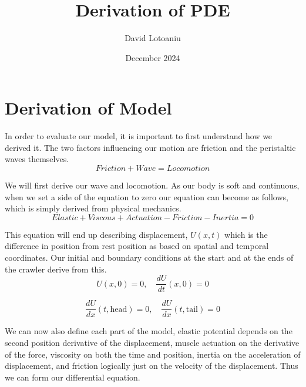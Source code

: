 \documentclass{article}
\title{Derivation of PDE}
\author{David Lotoaniu}
\date{December 2024}
\begin{document}
\maketitle

\section{Derivation of Model}
\par In order to evaluate our model, it is important to first understand how we derived it. The two factors influencing our motion are friction and the peristaltic waves themselves. 
\begin{equation}
    Friction + Wave = Locomotion
    \label{eq:example_equation}
\end{equation}
\par We will first derive our wave and locomotion. As our body is soft and continuous, when we set a side of the equation to zero our equation can become as follows, which is simply derived from physical mechanics. 
\begin{equation}
    Elastic + Viscous + Actuation - Friction - Inertia = 0
    \label{eq:example_equation}
\end{equation}
\par This equation will end up describing displacement, $U(x,t)$ which is the difference in position from rest position as based on spatial and temporal coordinates. Our initial and boundary conditions at the start and at the ends of the crawler derive from this.
\begin{equation}
    U(x,0) = 0, \quad \frac{dU}{dt}(x,0) = 0
    \label{eq:initial_conditions}
\end{equation}

\begin{equation}
    \frac{dU}{dx}(t,\text{head}) = 0, \quad \frac{dU}{dx}(t,\text{tail}) = 0
    \label{eq:boundary_conditions}
\end{equation}

\par We can now also define each part of the model, elastic potential depends on the second position derivative of the displacement, muscle actuation on the derivative of the force, viscosity on both the time and position, inertia on the acceleration of displacement, and friction logically just on the velocity of the displacement. Thus we can form our differential equation.
\end{document}

